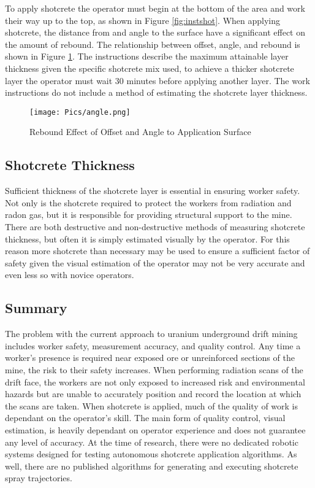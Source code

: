 To apply shotcrete the operator must begin at the bottom of the area and work their way up to the top, as shown in Figure \ref{fig:instshot}. When applying shotcrete, the distance from and angle to the surface have a significant effect on the amount of rebound. The relationship between offset, angle, and rebound is shown in Figure \ref{fig:rebound}. The instructions describe the maximum attainable layer thickness given the specific shotcrete mix used, to achieve a thicker shotcrete layer the operator must wait 30 minutes before applying another layer. The work instructions do not include a method of estimating the shotcrete layer thickness.\\

\begin{figure}
    \centering
    \texttt{[image: Pics/angle.png]}
    \caption{Rebound Effect of Offset and Angle to Application Surface \cite{camedoc}}
    \label{fig:rebound}
\end{figure}

\subsection{Shotcrete Thickness}

Sufficient thickness of the shotcrete layer is essential in ensuring worker safety. Not only is the shotcrete required to protect the workers from radiation and radon gas, but it is responsible for providing structural support to the mine. There are both destructive and non-destructive methods of measuring shotcrete thickness, but often it is simply estimated visually by the operator. For this reason more shotcrete than necessary may be used to ensure a sufficient factor of safety given the visual estimation of the operator may not be very accurate and even less so with novice operators.\\

\subsection{Summary}

The problem with the current approach to uranium underground drift mining includes worker safety, measurement accuracy, and quality control. Any time a worker's presence is required near exposed ore or unreinforced sections of the mine, the risk to their safety increases. When performing radiation scans of the drift face, the workers are not only exposed to increased risk and environmental hazards but are unable to accurately position and record the location at which the scans are taken. When shotcrete is applied, much of the quality of work is dependant on the operator's skill. The main form of quality control, visual estimation, is heavily dependant on operator experience and does not guarantee any level of accuracy. At the time of research, there were no dedicated robotic systems designed for testing autonomous shotcrete application algorithms. As well, there are no published algorithms for generating and executing shotcrete spray trajectories.\\

